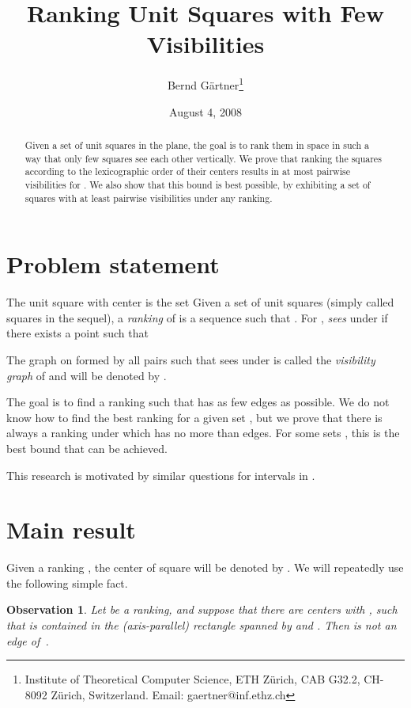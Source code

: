 \documentclass[fleqn,11pt]{article}
\newtheorem{observation}[definition]{Observation}
\begin{document}
\title{Ranking Unit Squares with Few Visibilities} 
\author{Bernd G\"artner\thanks{
Institute of Theoretical Computer Science, 
ETH Z{\"u}rich, CAB G32.2, CH-8092 Z{\"u}rich, Switzerland. Email:
gaertner@inf.ethz.ch}}
\date{August 4, 2008} 
\maketitle

\begin{abstract}
  Given a set of  unit squares in the plane, the goal is to rank
  them in space in such a way that only few squares see each other
  vertically.  We prove that ranking the squares according to the
  lexicographic order of their centers results in at most 
  pairwise visibilities for .  We also show that this bound is
  best possible, by exhibiting a set of  squares with at least
   pairwise visibilities under any ranking.
\end{abstract}

\section{Problem statement}
The unit square with center  is the set
 Given a set  of  unit squares (simply called squares in the sequel), a
\emph{ranking} of  is a sequence
 such that . For ,  \emph{sees}
 under  if there exists a point  such that


The graph on  formed by all pairs  such that
 sees  under  is called the \emph{visibility graph}
of  and will be denoted by . 

The goal is to find a ranking  such that  has as
few edges as possible. We do not know how to find the best ranking for
a given set , but we prove that there is always a ranking 
 under which  has no more than  edges. For
some sets , this is the best bound that can be achieved.

This research is motivated by similar questions for intervals in
 \cite{intervals}.

\section{Main result}
Given a ranking , the center of square
 will be denoted by .  We will
repeatedly use the following simple fact.

\begin{observation}\label{obs:help}
  Let  be a ranking, and suppose that
  there are centers  with , such that  is
  contained in the (axis-parallel) rectangle spanned by  and
  . Then  is not an edge of~.
\end{observation}
\end{document}

